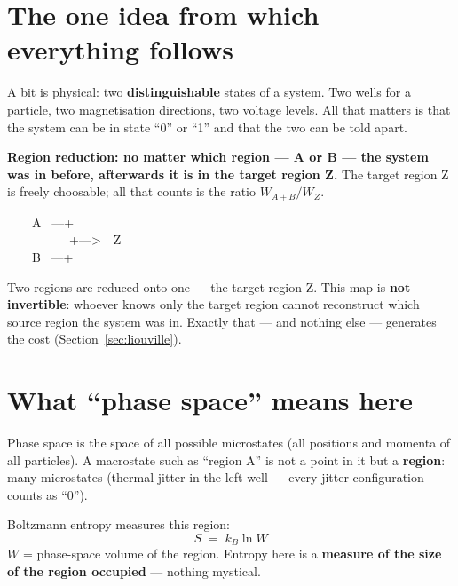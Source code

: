 \section{The one idea from which everything follows}

A bit is physical: two \textbf{distinguishable} states of a system. Two wells for
a particle, two magnetisation directions, two voltage levels. All that matters is
that the system can be in state “0” or “1” and that the two can be told apart.

\textbf{Region reduction: no matter which region --- A or B --- the system was in
before, afterwards it is in the target region Z.} The target region Z is freely
choosable; all that counts is the ratio $W_{A+B}/W_Z$.

\begin{center}
\begin{minipage}{0.42\textwidth}
\ttfamily\small
\begin{tabbing}
\ \ \ \ A \ ---+\\
\ \ \ \ \ \ \ \ \ \ +--->\ \ Z\\
\ \ \ \ B \ ---+
\end{tabbing}
\end{minipage}
\end{center}

Two regions are reduced onto one --- the target region Z. This map is
\textbf{not invertible}: whoever knows only the target region cannot reconstruct
which source region the system was in. Exactly that --- and nothing else ---
generates the cost (Section~\ref{sec:liouville}).

\section{What “phase space” means here}

Phase space is the space of all possible microstates (all positions and momenta of
all particles). A macrostate such as “region A” is not a point in it but a
\textbf{region}: many microstates (thermal jitter in the left well --- every
jitter configuration counts as “0”).

\LS Boltzmann entropy measures this region:
\[
  S \;=\; k_B \ln W
\]
$W$ = phase-space volume of the region. Entropy here is a \textbf{measure of the
size of the region occupied} --- nothing mystical.


